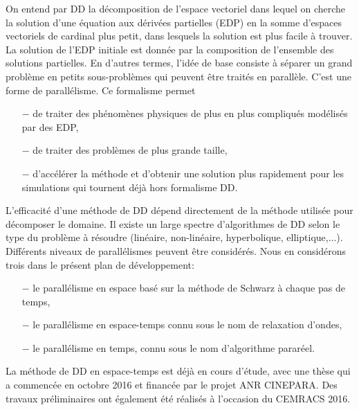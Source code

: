 On entend par DD la d\'ecomposition de l'espace vectoriel dans lequel on cherche la solution d'une \'equation aux d\'eriv\'ees partielles (EDP) en la somme d'espaces vectoriels de cardinal plus petit, dans lesquels la solution est plus facile \`a trouver. La solution de l'EDP initiale est donn\'ee par la composition de l'ensemble des solutions partielles. En d'autres termes, l'id\'ee de base consiste \`a s\'eparer un grand probl\`eme en petits sous-probl\`emes qui peuvent \^etre trait\'es en parall\`ele. C'est une forme de parall\'elisme. Ce formalisme permet

\begin{itemize}
\item[$-$]
de traiter des ph\'enom\`enes physiques de plus en plus compliqu\'es mod\'elis\'es par des EDP,
\item[$-$]
de traiter des probl\`emes de plus grande taille,
\item[$-$]
d'acc\'el\'erer la m\'ethode et d'obtenir une solution plus rapidement pour les simulations qui tournent d\'ej\`a hors formalisme DD.
\end{itemize}
L'efficacit\'e d'une m\'ethode de DD d\'epend directement de la m\'ethode utilis\'ee pour d\'ecomposer le domaine. Il existe un large spectre d'algorithmes de DD selon le type du probl\`eme \`a r\'esoudre (lin\'eaire, non-lin\'eaire, hyperbolique, elliptique,...). Diff\'erents niveaux de parall\'elismes peuvent \^etre consid\'er\'es. Nous en consid\'erons trois dans le pr\'esent plan de d\'eveloppement:

\begin{itemize}
\item[$-$]
le parall\'elisme en espace bas\'e sur la m\'ethode de Schwarz \`a chaque pas de temps,
\item[$-$]
le parall\'elisme en espace-temps connu sous le nom de relaxation d'ondes,
\item[$-$]
le parall\'elisme en temps, connu sous le nom d'algorithme parar\'eel.
\end{itemize}

\medskip

\begin{rque}
La m\'ethode de DD en espace-temps est d\'ej\`a en cours d'\'etude, avec une th\`ese qui a commenc\'ee en octobre 2016 et financ\'ee par le projet ANR CINEPARA. Des travaux pr\'eliminaires ont \'egalement \'et\'e r\'ealis\'es \`a l'occasion du CEMRACS 2016.
\end{rque}   

